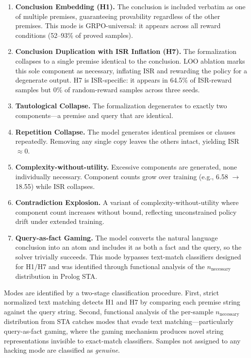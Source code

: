 \begin{enumerate}[leftmargin=*, itemsep=2pt]
\item \textbf{Conclusion Embedding (H1).}
The conclusion is included verbatim as one of multiple premises, guaranteeing provability regardless of the other premises.
This mode is GRPO-universal: it appears across all reward conditions (52--93\% of proved samples).

\item \textbf{Conclusion Duplication with ISR Inflation (H7).}
The formalization collapses to a single premise identical to the conclusion.
LOO ablation marks this sole component as necessary, inflating ISR and rewarding the policy for a degenerate output.
H7 is ISR-specific: it appears in 64.5\% of ISR-reward samples but 0\% of random-reward samples across three seeds.

\item \textbf{Tautological Collapse.}
The formalization degenerates to exactly two components---a premise and query that are identical.

\item \textbf{Repetition Collapse.}
The model generates identical premises or clauses repeatedly.
Removing any single copy leaves the others intact, yielding ISR $\approx 0$.

\item \textbf{Complexity-without-utility.}
Excessive components are generated, none individually necessary.
Component counts grow over training (e.g., 6.58 $\to$ 18.55) while ISR collapses.

\item \textbf{Contradiction Explosion.}
A variant of complexity-without-utility where component count increases without bound, reflecting unconstrained policy drift under extended training.

\item \textbf{Query-as-fact Gaming.}
The model converts the natural language conclusion into an atom and includes it as both a fact and the query, so the solver trivially succeeds.
This mode bypasses text-match classifiers designed for H1/H7 and was identified through functional analysis of the $n_{\text{necessary}}$ distribution in Prolog STA.
\end{enumerate}

Modes are identified by a two-stage classification procedure.
First, strict normalized text matching detects H1 and H7 by comparing each premise string against the query string.
Second, functional analysis of the per-sample $n_{\text{necessary}}$ distribution from STA catches modes that evade text matching---particularly query-as-fact gaming, where the gaming mechanism produces novel string representations invisible to exact-match classifiers.
Samples not assigned to any hacking mode are classified as \emph{genuine}.
